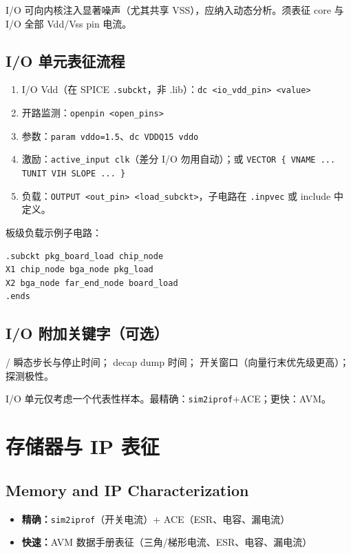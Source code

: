 I/O 可向内核注入显著噪声（尤其共享 VSS），应纳入动态分析。须表征 core 与 I/O 全部 Vdd/Vss pin 电流。

\subsection{I/O 单元表征流程}
\begin{enumerate}
  \item I/O Vdd（在 SPICE \texttt{.subckt}，非 .lib）：\texttt{dc <io\_vdd\_pin> <value>}
  \item 开路监测：\texttt{openpin <open\_pins>}
  \item 参数：\texttt{param vddo=1.5}、\texttt{dc VDDQ15 vddo}
  \item 激励：\texttt{active\_input clk}（差分 I/O 勿用自动）；或 \texttt{VECTOR \{ VNAME ... TUNIT VIH SLOPE ... \}}
  \item 负载：\texttt{OUTPUT <out\_pin> <load\_subckt>}，子电路在 \texttt{.inpvec} 或 include 中定义。
\end{enumerate}

板级负载示例子电路：
\begin{lstlisting}
.subckt pkg_board_load chip_node
X1 chip_node bga_node pkg_load
X2 bga_node far_end_node board_load
.ends
\end{lstlisting}

\subsection{I/O 附加关键字（可选）}
/ 瞬态步长与停止时间； decap dump 时间； 开关窗口（向量行末优先级更高）； 探测极性。

\begin{noteBox}
I/O 单元仅考虑一个代表性样本。最精确：\texttt{sim2iprof}+ACE；更快：AVM。
\end{noteBox}

\section{存储器与 IP 表征}
\subsection*{Memory and IP Characterization}

\begin{itemize}
  \item \textbf{精确：}\texttt{sim2iprof}（开关电流）+ ACE（ESR、电容、漏电流）
  \item \textbf{快速：}AVM 数据手册表征（三角/梯形电流、ESR、电容、漏电流）
\end{itemize}

